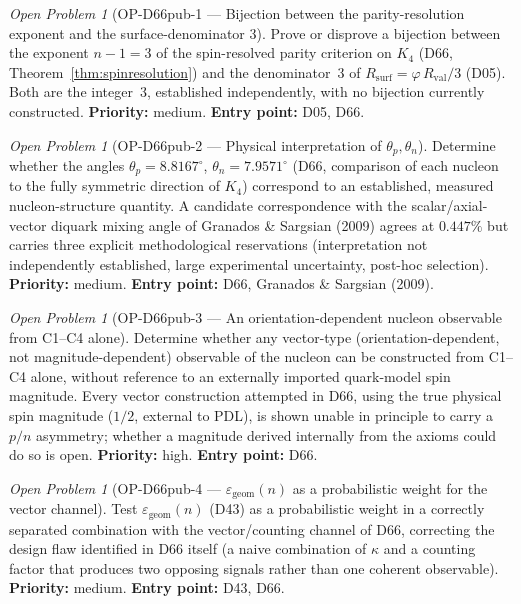 \documentclass[11pt,a4paper]{article}
\newcommand{\Rval}{R_{\mathrm{val}}}
\theoremstyle{plain}
\theoremstyle{definition}
\theoremstyle{remark}
\newtheorem{openproblem}[theorem]{Open Problem}
\newcommand{\Rsurf}{R_{\mathrm{surf}}}
\begin{document}
\begin{openproblem}[OP-D66pub-1 --- Bijection between the parity-resolution exponent and the surface-denominator 3]
\label{op:D66pubone}
Prove or disprove a bijection between the exponent $n-1=3$ of the spin-resolved parity criterion on $K_4$ (D66, Theorem~\ref{thm:spinresolution}) and the denominator~3 of $\Rsurf=\varphi\,\Rval/3$ (D05). Both are the integer~3, established independently, with no bijection currently constructed. \textbf{Priority:} medium. \textbf{Entry point:} D05, D66.
\end{openproblem}

\begin{openproblem}[OP-D66pub-2 --- Physical interpretation of $\theta_p,\theta_n$]
\label{op:D66pubtwo}
Determine whether the angles $\theta_p=8.8167^\circ$, $\theta_n=7.9571^\circ$ (D66, comparison of each nucleon to the fully symmetric direction of $K_4$) correspond to an established, measured nucleon-structure quantity. A candidate correspondence with the scalar/axial-vector diquark mixing angle of Granados \& Sargsian (2009) agrees at $0.447\%$ but carries three explicit methodological reservations (interpretation not independently established, large experimental uncertainty, post-hoc selection). \textbf{Priority:} medium. \textbf{Entry point:} D66, Granados \& Sargsian (2009).
\end{openproblem}

\begin{openproblem}[OP-D66pub-3 --- An orientation-dependent nucleon observable from C1--C4 alone]
\label{op:D66pubthree}
Determine whether any vector-type (orientation-dependent, not magnitude-dependent) observable of the nucleon can be constructed from C1--C4 alone, without reference to an externally imported quark-model spin magnitude. Every vector construction attempted in D66, using the true physical spin magnitude ($1/2$, external to PDL), is shown unable in principle to carry a $p/n$ asymmetry; whether a magnitude derived internally from the axioms could do so is open. \textbf{Priority:} high. \textbf{Entry point:} D66.
\end{openproblem}

\begin{openproblem}[OP-D66pub-4 --- $\varepsilon_{\mathrm{geom}}(n)$ as a probabilistic weight for the vector channel]
\label{op:D66pubfour}
Test $\varepsilon_{\mathrm{geom}}(n)$ (D43) as a probabilistic weight in a correctly separated combination with the vector/counting channel of D66, correcting the design flaw identified in D66 itself (a naive combination of $\kappa$ and a counting factor that produces two opposing signals rather than one coherent observable). \textbf{Priority:} medium. \textbf{Entry point:} D43, D66.
\end{openproblem}
\end{document}
